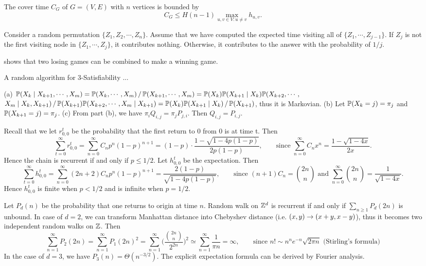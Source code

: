 \documentclass[main.tex]{subfiles}
\begin{document}
\begin{theorem}
	The cover time $C_G$ of $G=(V,E)$ with $n$ vertices is bounded by
	\[C_G\le H(n-1)\max_{u,v\in V: u\not=v}h_{u,v}.\]
\end{theorem}

\begin{pf}
	Consider a random permutation $\{Z_1,Z_2,\cdots,Z_n\}$. Assume that we have computed the expected time visiting all of $\{Z_1,\cdots, Z_{j-1}\}$. If $Z_j$ is not the first visiting node in $\{Z_1,\cdots, Z_j\}$, it contributes nothing. Otherwise, it contributes to the answer with the probability of $1/j$.
\end{pf}

 shows that two losing games can be combined to make a winning game.

\bigskip

{\bs A random algorithm for 3-Satisfiability} ...

\bigskip

 (a) $\mathbb{P}(X_k\mid X_{k+1},\cdots,X_m) = \mathbb{P}(X_k,\cdots,X_m) \,/\, \mathbb{P}(X_{k+1},\cdots,X_m) = \mathbb{P}(X_k) \mathbb{P}(X_{k+1} \mid X_{k}) \mathbb{P}(X_{k+2},\cdots,$ $X_{m} \mid X_{k}, X_{k+1}) \,/\, \mathbb{P}(X_{k+1}) \mathbb{P}(X_{k+2},\cdots,X_{m} \mid X_{k+1}) = \mathbb{P}(X_k) \mathbb{P}(X_{k+1} \mid X_k) \,/\, \mathbb{P}(X_{k+1})$, thus it is Markovian. (b) Let $\mathbb{P}(X_k=j)=\pi_j$ and $\mathbb{P}(X_{k+1}=j)=\pi_j$. (c) From part (b), we have $\pi_i Q_{i,j} = \pi_j P_{j,i}$. Then $Q_{i,j} = P_{i,j}$.

 Recall that we let $r^t_{0,0}$ be the probability that the first return to 0 from 0 is at time t. Then
\[\sum_{t=0}^{\infty} r^t_{0,0} = \sum_{n=0}^{\infty}C_np^n(1-p)^{n+1}=(1-p)\cdot \frac{1-\sqrt{1-4p(1-p)}}{2p(1-p)},\qquad \text{since } \sum_{n=0}^{\infty} C_n x^n = \frac{1-\sqrt{1-4x}}{2x}.\]
Hence the chain is recurrent if and only if $p\le 1/2$. Let $h^t_{0,0}$ be the expectation. Then
\[\sum_{t=0}^{\infty} h^t_{0,0} = \sum_{n=0}^{\infty}(2n+2)C_np^n(1-p)^{n+1}=\frac{2(1-p)}{\sqrt{1-4p(1-p)}},\qquad \text{since }(n+1)C_n=\binom{2n}{n} \text{ and } \sum_{n=0}^{\infty}\binom{2n}{n} = \frac{1}{\sqrt{1-4x}}.\]
Hence $h^t_{0,0}$ is finite when $p < 1/2$ and is infinite when $p = 1/2$.

  Let $P_d(n)$ be the probability that one returns to origin at time $n$. Random walk on $\mathbb{Z}^d$ is recurrent if and only if $\sum_{n\ge 1}P_d(2n)$ is unbound. In case of $d=2$, we can transform Manhattan distance into Chebyshev distance (i.e. $(x,y)\rightarrow(x+y,x-y)$), thus it becomes two independent random walks on $\mathbb{Z}$. Then
\[
	\sum_{n=1}^{\infty}P_2(2n)=\sum_{n=1}^{\infty}P_1(2n)^2=\sum_{n=1}^{\infty}\biggl(\frac{\binom{2n}{n}}{2^{2n}}\biggr)^2\simeq\sum_{n=1}^{\infty}\frac{1}{\pi n} = \infty,\qquad \text{since }n!\sim n^ne^{-n}\sqrt{2\pi n} \text{ (Stirling’s formula)}
\]
In the case of $d=3$, we have $P_3(n)=\Theta(n^{-3/2})$. The explicit expectation formula can be derived by Fourier analysis.
\end{document}
